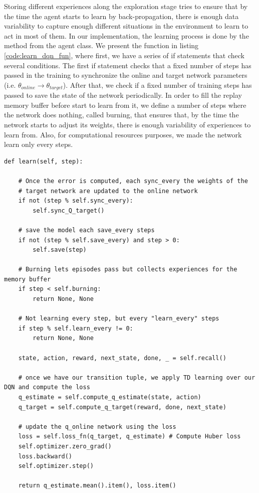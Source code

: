Storing different experiences along the exploration stage tries to ensure that by the time the agent starts to learn by back-propagation, there is enough data variability to capture enough different situations in the environment to learn to act in most of them. In our implementation, the learning process is done by the  method from the agent class. We present the function in listing \ref{code:learn_dqn_fun}, where first, we have a series of if statements that check several conditions. The first if statement checks that a fixed number of steps has passed in the training to synchronize the online and target network parameters (i.e. $\theta_{online} \rightarrow \theta_{target}$). After that, we check if a fixed number of training steps has passed to save the state of the network periodically. In order to fill the replay memory buffer before start to learn from it, we define a number of steps where the network does nothing, called burning, that ensures that, by the time the network starts to adjust its weights, there is enough variability of experiences to learn from. Also, for computational resources purposes, we made the network learn only every  steps.

\begin{lstlisting}[caption={\inlinecode{learn} function from the DQN agent}, label={code:learn_dqn_fun}]
def learn(self, step):
	
	# Once the error is computed, each sync_every the weights of the 
	# target network are updated to the online network
	if not (step % self.sync_every):
		self.sync_Q_target()
	
	# save the model each save_every steps
	if not (step % self.save_every) and step > 0:
		self.save(step)
	
	# Burning lets episodes pass but collects experiences for the memory buffer
	if step < self.burning:
		return None, None
	
	# Not learning every step, but every "learn_every" steps
	if step % self.learn_every != 0:
		return None, None
	
	state, action, reward, next_state, done, _ = self.recall()
	
	# once we have our transition tuple, we apply TD learning over our DQN and compute the loss
	q_estimate = self.compute_q_estimate(state, action)
	q_target = self.compute_q_target(reward, done, next_state)
	
	# update the q_online network using the loss
	loss = self.loss_fn(q_target, q_estimate) # Compute Huber loss
	self.optimizer.zero_grad()
	loss.backward()
	self.optimizer.step()
	
	return q_estimate.mean().item(), loss.item()
\end{lstlisting} 


